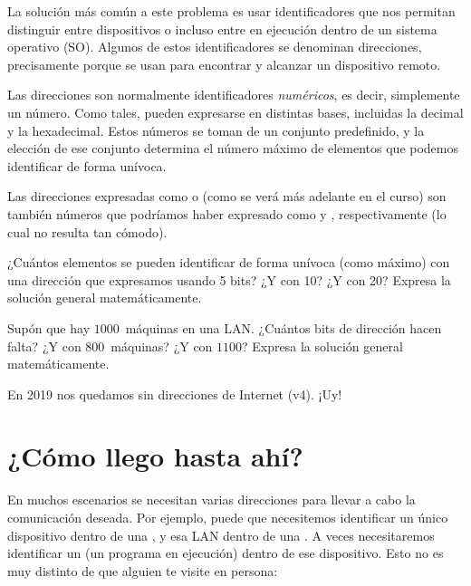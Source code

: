 La solución más común a este problema es usar identificadores que nos permitan
distinguir entre dispositivos o incluso entre  en ejecución
dentro de un sistema operativo (SO). Algunos de estos identificadores se
denominan direcciones, precisamente porque se usan
para encontrar y alcanzar un dispositivo remoto.


Las direcciones son normalmente identificadores \textit{numéricos}, es decir, simplemente un número.
Como tales, pueden expresarse en distintas bases, incluidas la decimal y la hexadecimal.
Estos números se toman de un conjunto predefinido, y la elección de ese conjunto
determina el número máximo de elementos que podemos identificar de forma unívoca.

\begin{remark}
Las direcciones expresadas como  o 
(como se verá más adelante en el curso) son también números que podríamos haber expresado
como  y , respectivamente
(lo cual no resulta tan cómodo).
\end{remark}

\begin{exercise}
¿Cuántos elementos se pueden identificar de forma unívoca (como máximo) con una dirección que expresamos
usando 5 bits? ¿Y con 10? ¿Y con 20? Expresa la solución general matemáticamente.
\end{exercise}

\begin{exercise}
Supón que hay $1000$~máquinas en una LAN. ¿Cuántos bits de dirección hacen falta?
¿Y con $800$~máquinas? ¿Y con $1100$? Expresa la solución general matemáticamente.
\end{exercise} 

\begin{remark}
En 2019 nos quedamos sin direcciones de Internet (v4). ¡Uy!
\end{remark}

\section{¿Cómo llego hasta ahí?}\label{sec:where:route}

En muchos escenarios se necesitan varias direcciones para llevar a cabo la
comunicación  deseada. Por ejemplo, puede que necesitemos identificar
un único dispositivo dentro de una , y esa LAN dentro de una . A veces necesitaremos
identificar un  (un programa en ejecución) dentro de ese dispositivo.
Esto no es muy distinto de que alguien te visite en persona:

